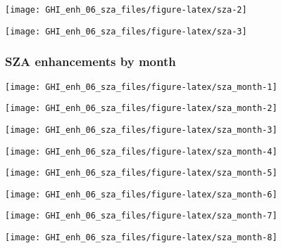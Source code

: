 \documentclass[
  10pt,
  a4paper,oneside]{article}
\begin{document}
\begin{center}\texttt{[image: GHI\_enh\_06\_sza\_files/figure-latex/sza-2]} \end{center}

\begin{center}\texttt{[image: GHI\_enh\_06\_sza\_files/figure-latex/sza-3]} \end{center}

\newpage
\FloatBarrier

\hypertarget{sza-enhancements-by-month}{%
\subsubsection{SZA enhancements by month}\label{sza-enhancements-by-month}}

\begin{center}\texttt{[image: GHI\_enh\_06\_sza\_files/figure-latex/sza\_month-1]} \end{center}

\begin{center}\texttt{[image: GHI\_enh\_06\_sza\_files/figure-latex/sza\_month-2]} \end{center}

\begin{center}\texttt{[image: GHI\_enh\_06\_sza\_files/figure-latex/sza\_month-3]} \end{center}

\begin{center}\texttt{[image: GHI\_enh\_06\_sza\_files/figure-latex/sza\_month-4]} \end{center}

\begin{center}\texttt{[image: GHI\_enh\_06\_sza\_files/figure-latex/sza\_month-5]} \end{center}

\begin{center}\texttt{[image: GHI\_enh\_06\_sza\_files/figure-latex/sza\_month-6]} \end{center}

\begin{center}\texttt{[image: GHI\_enh\_06\_sza\_files/figure-latex/sza\_month-7]} \end{center}

\begin{center}\texttt{[image: GHI\_enh\_06\_sza\_files/figure-latex/sza\_month-8]} \end{center}
\end{document}
